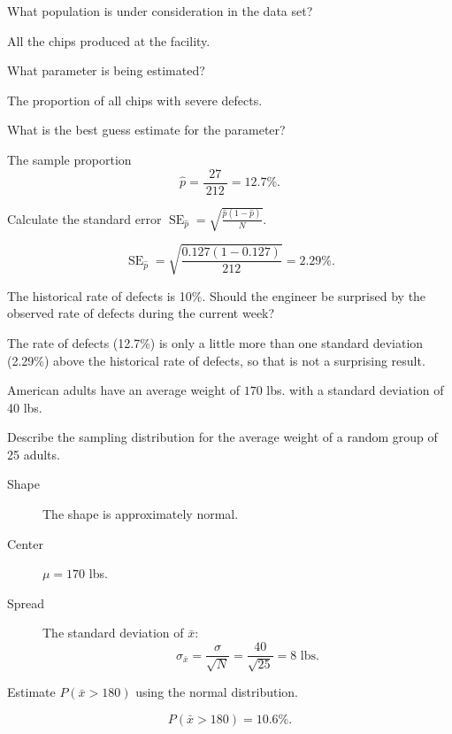 \documentclass[12pt]{exam}
\newcounter{countA}
\begin{document}
\begin{questions}
  \begin{parts}
  \item
    What population is under consideration in the data set?
\begin{solution}
All the chips produced at the facility.
\end{solution}
\vfill
  \item
    What parameter is being estimated?
\begin{solution}
The proportion of all chips with severe defects. 
\end{solution}
\vfill
  \item
    What is the best guess estimate for the parameter?
\begin{solution}
The sample proportion
$$\hat{p} = \frac{ 27 }{~ 212 ~} = 12.7\%.$$
\end{solution}
\vfill
  \item
    Calculate the standard error $\displaystyle \operatorname{SE}_{\hat{p}} = \sqrt{\frac{\hat{p}(1-\hat{p})}{N}}.$
\begin{solution}
$$\operatorname{SE}_{\hat{p}} = \sqrt{\frac{ 0.127 (1-0.127) }{ 212 }} = 2.29\%.$$
\end{solution}
\vfill
  \item
    The historical rate of defects is 10\%. Should the engineer be
    surprised by the observed rate of defects during the current week?
\begin{solution}
The rate of defects (12.7\%) is only a little more than one standard deviation (2.29\%) above the historical rate of defects, so that is not a surprising result. 
\end{solution}
\vfill
  \end{parts}
\item
  American adults have an average weight of \(170\) lbs. with a standard
  deviation of 40 lbs.

  \begin{parts}
  \item
    Describe the sampling distribution for the average weight of a
    random group of 25 adults.
\begin{solution}
\begin{description}
\item[Shape] The shape is approximately normal.
\item[Center] $\mu = 170$ lbs.
\item[Spread] The standard deviation of $\bar{x}$:
$$\sigma_{\bar{x}} = \frac{\sigma}{\sqrt{N}} = \frac{40}{\sqrt{25}} = 8 \text{ lbs}.$$
\end{description}
\end{solution}
\vfill
  \item
    Estimate \(P(\bar{x} > 180)\) using the normal distribution.
\begin{solution}
$$P(\bar{x} > 180) = 10.6\%.$$
\end{solution}
\vfill
  \end{parts}

\setcounter{countA}{\value{question}}
\end{questions}
\end{document}
